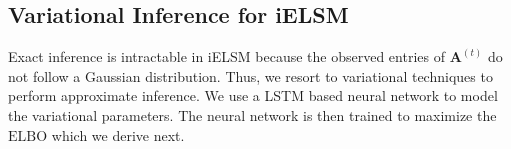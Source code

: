 \documentclass[letterpaper]{article} %
\begin{document}

\subsection{Variational Inference for iELSM}
\label{section:variationalinferenceforsELSM}
Exact inference is intractable in iELSM because the observed entries of $\mathbf{A}^{(t)}$ do not follow a Gaussian distribution. Thus, we resort to variational techniques \cite{BleiEtAl:2017:VariationalInferenceAReviewForStatisticians} to perform approximate inference. We use a LSTM based neural network to model the variational parameters. The neural network is then trained to maximize the $\mathrm{ELBO}$ which we derive next.
\end{document}
